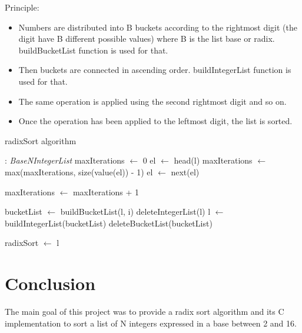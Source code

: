 \documentclass[book, nodocumentinfo]{upmethodology-document}
\begin{document}
Principle:
\begin{itemize}
    \item Numbers are distributed into B buckets according to the rightmost
        digit (the digit have B different possible values)
        where B is the list base or radix.
        buildBucketList function is used for that.
    \item Then buckets are connected in ascending order.
        buildIntegerList function is used for that.
    \item The same operation is applied using the second rightmost digit and so on.
    \item Once the operation has been applied to the leftmost digit, the list is sorted.
\end{itemize}

\begin{algorithm}[H]
    \caption{radixSort algorithm}
    \label{algo:basenintegerlistoflist-radix-sort}

    \begin{algorithmic}
         : \emph{BaseNIntegerList}
            \State maxIterations \(\leftarrow\) 0
            \State el \(\leftarrow\) head(l)
                \State maxIterations \(\leftarrow\) max(maxIterations, size(value(el)) - 1)
                \State el \(\leftarrow\) next(el)
            \EndWhile

            \State maxIterations \(\leftarrow\) maxIterations + 1

                \State bucketList \(\leftarrow\) buildBucketList(l, i)
                \State deleteIntegerList(l)
                \State l \(\leftarrow\) buildIntegerList(bucketList)
                \State deleteBucketList(bucketList)
            \EndFor

            \State radixSort \(\leftarrow\) l
        \EndFunction
    \end{algorithmic}
\end{algorithm}

\chapter{Conclusion}

The main goal of this project was to provide a radix sort algorithm and its C implementation
to sort a list of N integers expressed in a base between 2 and 16.
\end{document}
